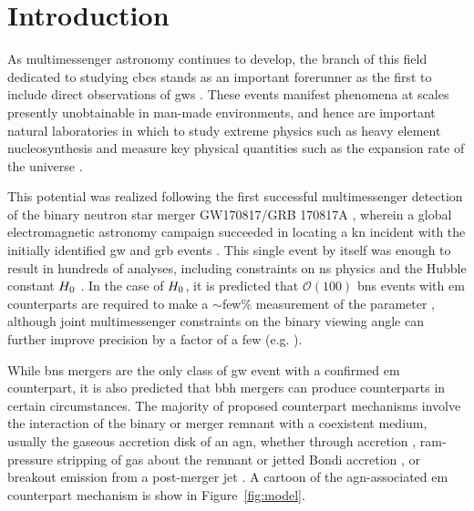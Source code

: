\documentclass[twocolumn]{aastex631}
\begin{document}
\section{Introduction}
\label{sec:intro}

As multimessenger astronomy continues to develop, the branch of this field dedicated to studying \glspl{cbc} stands as an important forerunner as the first to include direct observations of \glspl{gw} \citep{abbottMultimessengerObservationsBinary2017}.
These events manifest phenomena at scales presently unobtainable in man-made environments, and hence are important natural laboratories in which to study extreme physics such as heavy element nucleosynthesis \citep{symbalistyNeutronStarCollisions1982} and measure key physical quantities such as the expansion rate of the universe \citep{schutzDeterminingHubbleConstant1986, holzUsingGravitationalWaveStandard2005}.

This potential was realized following the first successful multimessenger detection of the binary neutron star merger GW170817/GRB 170817A \citep{abbottGravitationalWavesGammaRays2017}, wherein a global electromagnetic astronomy campaign succeeded in locating a \gls{kn} \citep{coulterSwopeSupernovaSurvey2017,Arcavi2017,Andreoni2017,Drout2017,Nicholl2017,Evans2017,Lipunov2017,Pian2017,Smartt2017,Utsumi2017,Valenti2017,kasliwal2017illuminating,troja2017x,Margutti2017,Shappee2017,soares-santosElectromagneticCounterpartBinary2017,Chornock2017,Tanvir2017} incident with the initially identified \gls{gw} and \gls{grb} events \citep{abbottMultimessengerObservationsBinary2017,Savchenko2017,Goldstein2017}. 
This single event by itself was enough to result in hundreds of analyses, including constraints on \gls{ns} physics \citep[e.g.][]{abbottGW170817MeasurementsNeutron2018} and the Hubble constant $H_{\rm 0}$ \citep{abbottGravitationalwaveStandardSiren2017}. %
In the case of $H_{\rm 0}$, it is predicted that $\mathcal{O}(100)$ \gls{bns} events with \gls{em} counterparts are required to make a $\sim$few\% measurement of the parameter \citep{chenTwoCentHubble2018}, although joint multimessenger constraints on the binary viewing angle can further improve precision by a factor of a few (e.g. \citealt{Hotokezaka2019, palmese2024standard}).

While \gls{bns} mergers are the only class of \gls{gw} event with a confirmed \gls{em} counterpart, it is also predicted that \gls{bbh} mergers can produce counterparts in certain circumstances.
The majority of proposed counterpart mechanisms involve the interaction of the binary or merger remnant with a coexistent medium, usually the gaseous accretion disk of an \gls{agn}, whether through accretion \citep{bartosRapidBrightStellarmass2017}, ram-pressure stripping of gas about the remnant or jetted Bondi accretion \citep{mckernanRampressureStrippingKicked2019}, or breakout emission from a post-merger jet \citep{tagawaObservableSignatureMerging2023,Tagawa:2023gpi}. 
A cartoon of the \gls{agn}-associated \gls{em} counterpart mechanism is show in Figure~\ref{fig:model}.
\end{document}
